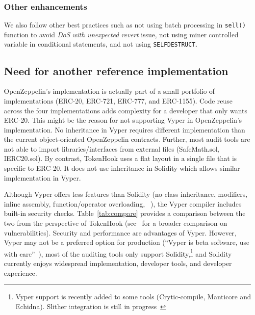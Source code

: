 \subsubsection{Other enhancements} We also follow other best practices such as not using batch processing in \texttt{sell()} function to avoid \textit{DoS with unexpected revert} issue, not using miner controlled variable in conditional statements, and not using \texttt{SELFDESTRUCT}.



\subsection{Need for another reference implementation}
OpenZeppelin's implementation is actually part of a small portfolio of implementations (ERC-20, ERC-721, ERC-777, and ERC-1155). Code reuse across the four implementations adds complexity for a developer that only wants ERC-20. This might be the reason for not supporting Vyper in OpenZeppelin's implementation. No inheritance in Vyper requires different implementation than the current object-oriented OpenZeppelin contracts. Further, most audit tools are not able to import libraries/interfaces from external files (\eg SafeMath.sol, IERC20.sol). By contrast, TokenHook uses a flat layout in a single file that is specific to ERC-20. It does not use inheritance in Solidity which allows similar implementation in Vyper.


Although Vyper offers less features than Solidity (\eg no class inheritance, modifiers, inline assembly, function/operator overloading, \etc~\cite{SolidityDoc}), the Vyper compiler includes built-in security checks. Table~\ref{tab:compare} provides a comparison between the two from the perspective of TokenHook (see~\cite{Vyper1} for a broader comparison on vulnerabilities). Security and performance are advantages of Vyper. However, Vyper may not be a preferred option for production (``Vyper is beta software, use with care''~\cite{VyperReadme}), most of the auditing tools only support Solidity,\footnote{Vyper support is recently added to some tools (\eg Crytic-compile, Manticore and Echidna). Slither integration is still in progress~\cite{Crytic}} and Solidity currently enjoys widespread implementation, developer tools, and developer experience.

